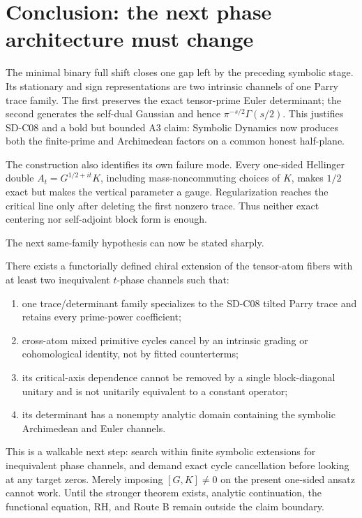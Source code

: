 \section{Conclusion: the next phase architecture must change}
\label{sec:conclusion}

The minimal binary full shift closes one gap left by the preceding symbolic
stage. Its stationary and sign representations are two intrinsic channels of
one Parry trace family. The first preserves the exact tensor-prime Euler
determinant; the second generates the self-dual Gaussian and hence
$\pi^{-s/2}\Gamma(s/2)$. This justifies SD-C08 and a bold but bounded A3
claim: Symbolic Dynamics now produces both the finite-prime and Archimedean
factors on a common honest half-plane.

The construction also identifies its own failure mode. Every one-sided
Hellinger double $A_t=G^{1/2+it}K$, including mass-noncommuting choices of
$K$, makes $1/2$ exact but makes the vertical parameter a gauge.
Regularization reaches the critical line only after deleting the first
nonzero trace. Thus neither exact centering nor self-adjoint block form is
enough.

The next same-family hypothesis can now be stated sharply.

\begin{conjecture}
\label{conj:coupling}
There exists a functorially defined chiral extension of the tensor-atom fibers
with at least two inequivalent $t$-phase channels such that:
\begin{enumerate}
  \item one trace/determinant family specializes to the SD-C08 tilted Parry
        trace and retains every prime-power coefficient;
  \item cross-atom mixed primitive cycles cancel by an intrinsic grading or
        cohomological identity, not by fitted counterterms;
  \item its critical-axis dependence cannot be removed by a single
        block-diagonal unitary and is not unitarily equivalent to a constant
        operator;
  \item its determinant has a nonempty analytic domain containing the
        symbolic Archimedean and Euler channels.
\end{enumerate}
\end{conjecture}

This is a walkable next step: search within finite symbolic extensions for
inequivalent phase channels, and demand exact cycle cancellation before
looking at any target zeros. Merely imposing $[G,K]\ne0$ on the present
one-sided ansatz cannot work. Until the stronger theorem exists, analytic
continuation, the functional equation, RH, and Route B remain outside the
claim boundary.

